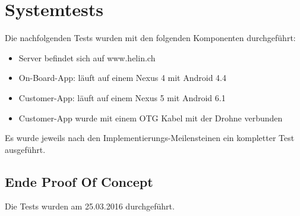 \newpage
\chapter{Systemtests}

Die nachfolgenden Tests wurden mit den folgenden Komponenten durchgeführt:

\begin{itemize}
	\item Server befindet sich auf www.helin.ch
	\item On-Board-App: läuft auf einem Nexus 4 mit Android 4.4
	\item Customer-App: läuft auf einem Nexus 5 mit Android 6.1
	\item Customer-App wurde mit einem OTG Kabel mit der Drohne verbunden
\end{itemize}

Es wurde jeweils nach den Implementierungs-Meilensteinen ein kompletter Test ausgeführt.

\section{Ende Proof Of Concept}

Die Tests wurden am 25.03.2016 durchgeführt.

